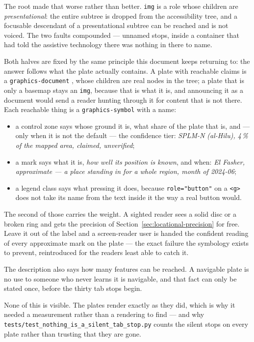 \documentclass[11pt]{article}
\begin{document}
The root made that worse rather than better. \texttt{img} is a role whose
children are \emph{presentational}: the entire subtree is dropped from the
accessibility tree, and a focusable descendant of a presentational subtree can
be reached and is not voiced. The two faults compounded --- unnamed stops,
inside a container that had told the assistive technology there was nothing in
there to name.

Both halves are fixed by the same principle this document keeps returning to:
the answer follows what the plate actually contains. A plate with reachable
claims is a \texttt{graphics-document} \parencite{graphics-aria}, whose children are
real nodes in the tree; a plate that is only a basemap stays an \texttt{img},
because that is what it is, and announcing it as a document would send a reader
hunting through it for content that is not there. Each reachable thing is a
\texttt{graphics-symbol} with a name:

\begin{itemize}
  \item a control zone says whose ground it is, what share of the plate that
        is, and --- only when it is not the default --- the confidence tier:
        \emph{SPLM-N (al-Hilu), 4\,\% of the mapped area, claimed,
        unverified};
  \item a mark says what it is, \emph{how well its position is known}, and
        when: \emph{El Fasher, approximate --- a place standing in for a whole
        region, month of 2024-06};
  \item a legend class says what pressing it does, because
        \texttt{role="button"} on a \texttt{<g>} does not take its name from
        the text inside it the way a real button would.
\end{itemize}

The second of those carries the weight. A sighted reader sees a solid disc or
a broken ring and gets the precision of Section~\ref{sec:locational-precision}
for free. Leave it out of the label and a screen-reader user is handed the
confident reading of every approximate mark on the plate --- the exact failure
the symbology exists to prevent, reintroduced for the readers least able to
catch it.

The description also says how many features can be reached. A navigable plate
is no use to someone who never learns it is navigable, and that fact can only
be stated once, before the thirty tab stops begin.

None of this is visible. The plates render exactly as they did, which is why
it needed a measurement rather than a rendering to find --- and why
\texttt{tests/test\_nothing\_is\_a\_silent\_tab\_stop.py} counts the silent
stops on every plate rather than trusting that they are gone.
\end{document}

